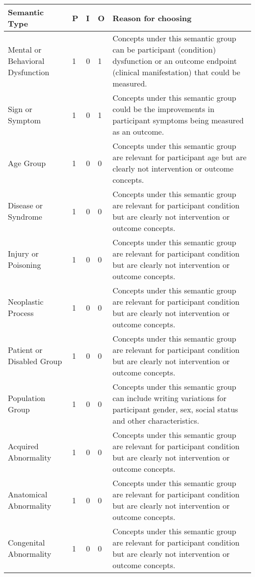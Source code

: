 \documentclass[10.7pt,]{article}
\begin{document}
\begin{longtable}{|l|p{0.3cm}|p{0.3cm}|p{0.3cm}|p{7.9cm}|}

    \endfirsthead
    \endhead
    \hline
        Semantic Type & P & I & O & Reason for choosing \\ \hline
        Mental or Behavioral Dysfunction & 1 & 0 & 1 & Concepts under this semantic group can be participant (condition) dysfunction or an outcome endpoint (clinical manifestation) that could be measured. \\ \hline
        Sign or Symptom & 1 & 0 & 1 & Concepts under this semantic group could be the improvements in participant symptoms being measured as an outcome. \\ \hline
        Age Group & 1 & 0 & 0 & Concepts under this semantic group are relevant for participant age but are clearly not intervention or outcome concepts. \\ \hline
        Disease or Syndrome & 1 & 0 & 0 & Concepts under this semantic group are relevant for participant condition but are clearly not intervention or outcome concepts. \\ \hline
        Injury or Poisoning & 1 & 0 & 0 & Concepts under this semantic group are relevant for participant condition but are clearly not intervention or outcome concepts. \\ \hline
        Neoplastic Process & 1 & 0 & 0 & Concepts under this semantic group are relevant for participant condition but are clearly not intervention or outcome concepts. \\ \hline
        Patient or Disabled Group & 1 & 0 & 0 & Concepts under this semantic group are relevant for participant condition but are clearly not intervention or outcome concepts. \\ \hline
        Population Group & 1 & 0 & 0 & Concepts under this semantic group can include writing variations for participant gender, sex, social status and other characteristics. \\ \hline
        Acquired Abnormality & 1 & 0 & 0 & Concepts under this semantic group are relevant for participant condition but are clearly not intervention or outcome concepts. \\ \hline
        Anatomical Abnormality & 1 & 0 & 0 & Concepts under this semantic group are relevant for participant condition but are clearly not intervention or outcome concepts. \\ \hline
        Congenital Abnormality & 1 & 0 & 0 & Concepts under this semantic group are relevant for participant condition but are clearly not intervention or outcome concepts. \\ \hline

\end{longtable}
\end{document}
